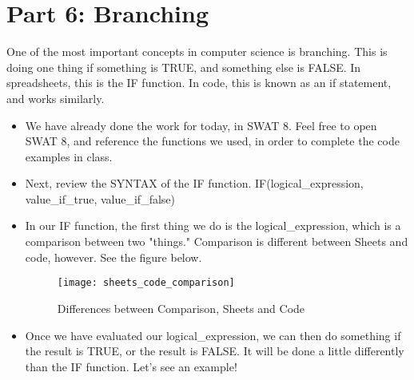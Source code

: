 \documentclass{article}
\begin{document}
\section*{Part 6: Branching}
One of the most important concepts in computer science is branching.  This is doing one thing if something is TRUE, and something else is FALSE. In spreadsheets, this is the IF function.  In code, this is known as an if statement, and works similarly.
\begin{itemize}
	\item We have already done the work for today, in SWAT 8.  Feel free to open SWAT 8, and reference the functions we used, in order to complete the code examples in class.
	\item Next, review the SYNTAX of the IF function.  IF(logical\_expression, value\_if\_true, value\_if\_false)
	\item In our IF function, the first thing we do is the logical\_expression, which is a comparison between two "things."  Comparison is different between Sheets and code, however.  See the figure below.
	\begin{figure}[H]
  \centering
  \texttt{[image: sheets\_code\_comparison]}
  \caption{Differences between Comparison, Sheets and Code}
\end{figure} 
	\item Once we have evaluated our logical\_expression, we can then do something if the result is TRUE, or the result is FALSE.  It will be done a little differently than the IF function.  Let's see an example!
\end{itemize}
\end{document}
